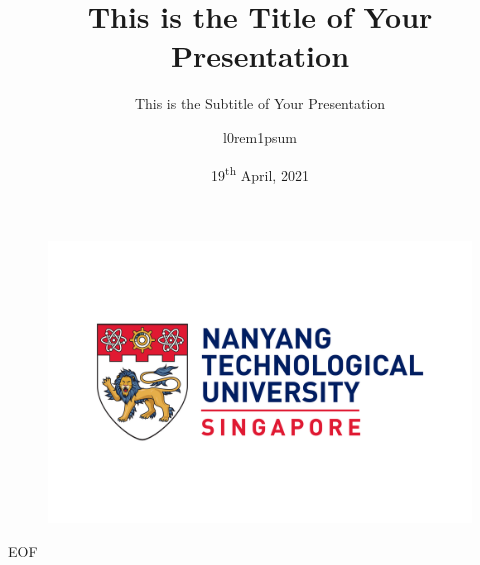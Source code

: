 \documentclass[aspectratio=169]{beamer}
\author{l0rem1psum}
\title[This is the Short Title of Your Presentation]{This is the Title of Your Presentation}
\subtitle{This is the Subtitle of Your Presentation}
\institute{School of Computer Science and Engineering, Nanyang Technological University}
\date{19\textsuperscript{th} April, 2021}
\begin{document}
\begin{frame}
    \titlepage
    \vspace{-10pt}
    \begin{figure}[htpb]
        \begin{center}
            \includegraphics[width=0.3\linewidth]{images/ntu-logo.png}
        \end{center}
    \end{figure}
\end{frame}

\begin{frame}
    \tableofcontents[sectionstyle=show,subsectionstyle=show/shaded/hide,subsubsectionstyle=show/shaded/hide]
\end{frame}








\begin{frame}[allowframebreaks]
    \printbibliography
\end{frame}

\begin{frame}
    \begin{center}
        {\Huge EOF}
    \end{center}
\end{frame}
\end{document}
